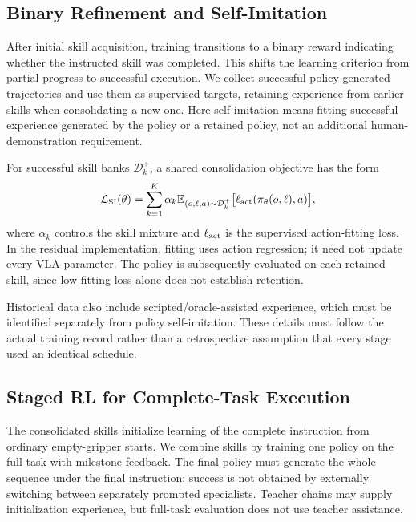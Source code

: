 \subsection{Binary Refinement and Self-Imitation}
After initial skill acquisition, training transitions to a binary reward indicating whether the instructed skill was completed. This shifts the learning criterion from partial progress to successful execution. We collect successful policy-generated trajectories and use them as supervised targets, retaining experience from earlier skills when consolidating a new one. Here self-imitation means fitting successful experience generated by the policy or a retained policy, not an additional human-demonstration requirement.

For successful skill banks $\mathcal D_k^+$, a shared consolidation objective has the form
\begin{equation}
\mathcal L_{\rm SI}(\theta)=\sum_{k=1}^{K}\alpha_k
\mathbb E_{(o,\ell,a)\sim\mathcal D_k^+}
\big[\ell_{\rm act}(\pi_\theta(o,\ell),a)\big],
\end{equation}
where $\alpha_k$ controls the skill mixture and $\ell_{\rm act}$ is the supervised action-fitting loss. In the residual implementation, fitting uses action regression; it need not update every VLA parameter. The policy is subsequently evaluated on each retained skill, since low fitting loss alone does not establish retention.

Historical data also include scripted/oracle-assisted experience, which must be identified separately from policy self-imitation.  These details must follow the actual training record rather than a retrospective assumption that every stage used an identical schedule.

\subsection{Staged RL for Complete-Task Execution}
The consolidated skills initialize learning of the complete instruction from ordinary empty-gripper starts. We combine skills by training one policy on the full task with milestone feedback. The final policy must generate the whole sequence under the final instruction; success is not obtained by externally switching between separately prompted specialists. Teacher chains may supply initialization experience, but full-task evaluation does not use teacher assistance.

